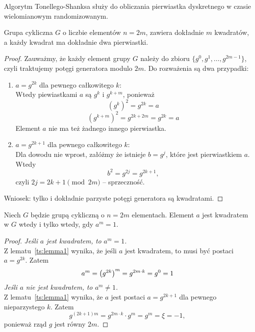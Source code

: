Algorytm Tonellego-Shanksa służy do obliczania pierwiastka dyskretnego w czasie wielomianowym randomizowanym.

\begin{lemma}\label{ts:lemma1}
    Grupa cykliczna \( G \) o liczbie elementów \(n = 2m \), zawiera dokładnie \( m \) kwadratów, a każdy kwadrat ma dokładnie dwa pierwiastki.
\end{lemma}
\begin{proof}
    Zauważmy, że każdy element grupy \( G \) należy do zbioru \( \{g^0, g^1, \dots, g^{2m-1}\} \), czyli traktujemy potęgi generatora modulo \( 2m \). Do rozważenia są dwa przypadki:
    \begin{enumerate}
        \item \( a = g^{2k} \) dla pewnego całkowitego \( k \): \\
        Wtedy piewiastkami \( a \) są \( g^k \) i \( g^{k+m} \), ponieważ
        \[
            (g^k)^2 = g^{2k} = a
        \]
        \[
            (g^{k+m})^2 = g^{2k+2m} = g^{2k} = a
        \]
        Element \( a \) nie ma też żadnego innego pierwiastka.
        \item \( a = g^{2k+1} \) dla pewnego całkowitego \( k \): \\
        Dla dowodu nie wprost, załóżmy że istnieje \( b = g^j \), które jest pierwiastkiem \( a \). Wtedy
        \[
            b^2 = g^{2j} = g^{2k + 1},
        \]
        czyli \( 2j = 2k + 1 \pmod{2m} \) -- sprzeczność.
    \end{enumerate}
    Wniosek: tylko i dokładnie parzyste potęgi generatora są kwadratami.
\end{proof}

\begin{lemma}\label{A11:lemma2}
    Niech \( G \) będzie grupą cykliczną o \( n = 2m \) elementach. Element \( a \) jest kwadratem w \( G \) wtedy i tylko wtedy, gdy \( a^m = 1 \).
\end{lemma}
\begin{proof}
    \textit{Jeśli \( a \) jest kwadratem, to \( a^m = 1\).} \\
    Z lematu~\ref{ts:lemma1} wynika, że jeśli \( a \) jest kwadratem, to musi być postaci \( a = g^{2k} \). Zatem
    \[
        a^m = \left(g^{2k}\right)^m = g^{2m \cdot k} = g^0 = 1
    \]
    \textit{Jeśli \( a \) nie jest kwadratem, to \( a^m \neq 1\).} \\
    Z lematu~\ref{ts:lemma1} wynika, że \( a \) jest postaci \( a = g^{2k+1} \) dla pewnego nieparzystego \( k \). Zatem
    \[
        g^{(2k+1)m} = g^{2m \cdot k} \cdot g^m = g^m = \xi = -1,
    \]
    ponieważ rząd \( g \) jest równy \( 2m \).
\end{proof}

